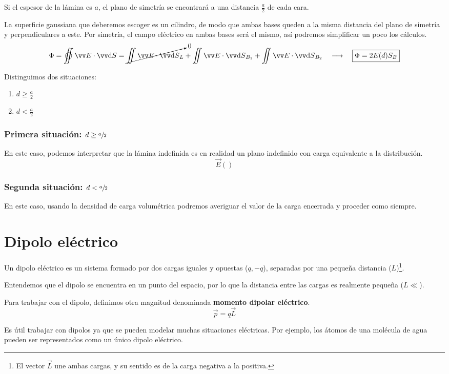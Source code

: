 \documentclass[a4paper]{book}
\begin{document}
Si el espesor de la lámina es $a$, el plano de simetría se encontrará a una distancia $\frac{a}{2}$ de cada cara.

La superficie gaussiana que deberemos escoger es un cilindro, de modo que ambas bases queden a la misma distancia del plano de simetría y perpendiculares a este. Por simetría, el campo eléctrico en ambas bases será el mismo, así podremos simplificar un poco los cálculos.
\[\Phi = \varoiint \vec{E}\cdot \vec{\dd S} = \cancelto{0}{\iint \vec{E}\cdot \vec{\dd S}_L} + \iint \vec{E}\cdot \vec{\dd S}_{B_1} + \iint \vec{E}\cdot \vec{\dd S}_{B_2} \quad \longrightarrow \quad \boxed{\Phi = 2E(d) S_B}\]

Distinguimos dos situaciones:
\begin{enumerate}
	\item $d\geq \frac{a}{2}$
	\item $d<\frac{a}{2}$
\end{enumerate}

\subsubsection{Primera situación: $d\geq \sfrac{a}{2}$}
En este caso, podemos interpretar que la lámina indefinida es en realidad un plano indefinido con carga equivalente a la distribución.
\[\vec{E}()\]
\subsubsection{Segunda situación: $d<\sfrac{a}{2}$}
En este caso, usando la densidad de carga volumétrica podremos averiguar el valor de la carga encerrada y proceder como siempre.

\section{Dipolo eléctrico}
Un dipolo eléctrico es un sistema formado por dos cargas iguales y opuestas ($q,-q$), separadas por una pequeña distancia ($L$)\footnote{El vector $\vec{L}$ une ambas cargas, y su sentido es de la carga negativa a la positiva.}.

Entendemos que el dipolo se encuentra en un punto del espacio, por lo que la distancia entre las cargas es realmente pequeña ($L\ll $).

Para trabajar con el dipolo, definimos otra magnitud denominada \textbf{momento dipolar eléctrico}.
\[\boxed{\vec{p}=q\vec{L}}\]

Es útil trabajar con dipolos ya que se pueden modelar muchas situaciones eléctricas. Por ejemplo, los átomos de una molécula de agua pueden ser representados como un único dipolo eléctrico.
\end{document}

